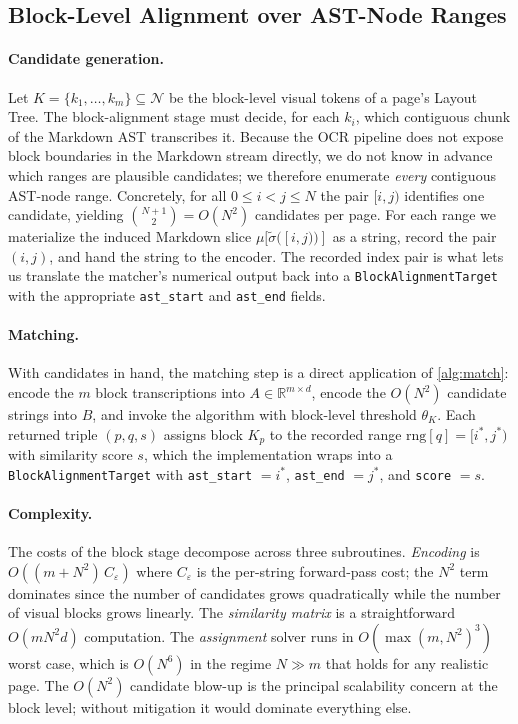 \documentclass{article}
\theoremstyle{definition}
\newcommand{\Nodes}{\mathcal{N}}
\begin{document}
\subsection{Block-Level Alignment over AST-Node Ranges}
\label{sec:block}

\paragraph{Candidate generation.}
Let $K = \{k_1, \ldots, k_m\} \subseteq \Nodes$ be the block-level
visual tokens of a page's Layout Tree.  The block-alignment stage
must decide, for each $k_i$, which contiguous chunk of the Markdown
AST transcribes it.  Because the OCR pipeline does not expose block
boundaries in the Markdown stream directly, we do not know in advance
which ranges are plausible candidates; we therefore enumerate
\emph{every} contiguous AST-node range.  Concretely, for all
$0 \le i < j \le N$ the pair $[i, j)$ identifies one candidate,
yielding $\binom{N+1}{2} = O(N^2)$ candidates per page.  For each
range we materialize the induced Markdown slice
$\mu[\widetilde{\sigma}([i, j))]$ as a string, record the pair
$(i, j)$, and hand the string to the encoder.  The recorded index
pair is what lets us translate the matcher's numerical output back
into a \texttt{BlockAlignmentTarget} with the appropriate
\texttt{ast\_start} and \texttt{ast\_end} fields.

\paragraph{Matching.}
With candidates in hand, the matching step is a direct application
of \cref{alg:match}: encode the $m$ block transcriptions into
$A \in \mathbb{R}^{m \times d}$, encode the $O(N^2)$ candidate
strings into $B$, and invoke the algorithm with block-level threshold
$\theta_K$.  Each returned triple $(p, q, s)$ assigns block $K_p$ to
the recorded range $\mathrm{rng}[q] = [i^{*}, j^{*})$ with similarity
score $s$, which the implementation wraps into a
\texttt{BlockAlignmentTarget} with
\texttt{ast\_start} $= i^{*}$, \texttt{ast\_end} $= j^{*}$, and
\texttt{score} $= s$.

\paragraph{Complexity.}
The costs of the block stage decompose across three subroutines.
\emph{Encoding} is $O((m + N^2)\,C_\varepsilon)$ where $C_\varepsilon$
is the per-string forward-pass cost; the $N^2$ term dominates since
the number of candidates grows quadratically while the number of
visual blocks grows linearly.  The \emph{similarity matrix} is a
straightforward $O(m N^2 d)$ computation.  The \emph{assignment}
solver runs in $O(\max(m, N^2)^3)$ worst case, which is
$O(N^6)$ in the regime $N \gg m$ that holds for any realistic page.
The $O(N^2)$ candidate blow-up is the principal scalability concern
at the block level; without mitigation it would dominate everything
else.
\end{document}

